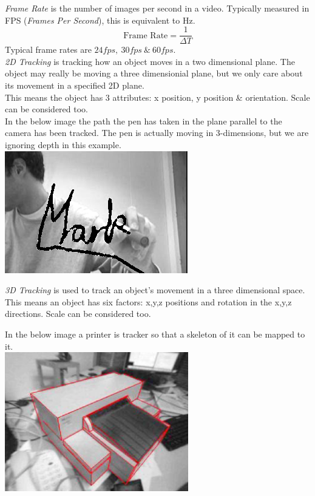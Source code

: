 \documentclass[11pt,a4paper]{article}
\begin{document}
\textit{Frame Rate} is the number of images per second in a video. Typically measured in FPS (\textit{Frames Per Second}), this is equivalent to Hz.
$$\text{Frame Rate}=\frac{1}{\Delta T}$$
\nb Typical frame rates are $24fps,\ 30fps\ \&\ 60fps$.\\

\textit{2D Tracking} is tracking how an object moves in a two dimensional plane. The object may really be moving a three dimensionial plane, but we only care about its movement in a specified 2D plane.\\
This means the object has 3 attributes: x position, y position \& orientation. Scale can be considered too.\\

In the below image the path the pen has taken in the plane parallel to the camera has been tracked. The pen is actually moving in 3-dimensions, but we are ignoring depth in this example.\\
\includegraphics[scale=1]{img/2dtracking.png}

\textit{3D Tracking} is used to track an object's movement in a three dimensional space. This means an object has six factors: x,y,z positions and rotation in the x,y,z directions. Scale can be considered too.

In the below image a printer is tracker so that a skeleton of it can be mapped to it.\\
\includegraphics[scale=1]{img/3dtracking.png}
\end{document}
